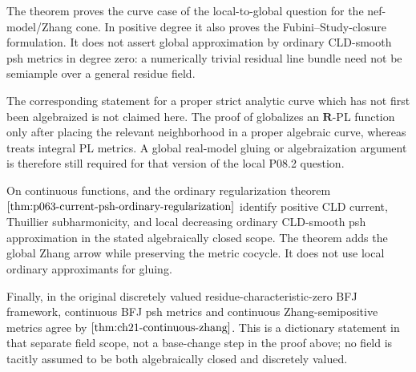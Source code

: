 \begin{remark}
\label{rem:p081-curve-comparisons}
The theorem proves the curve case of the local-to-global question for the
nef-model/Zhang cone. In positive degree it also proves the
Fubini--Study-closure formulation. It does not assert global approximation
by ordinary CLD-smooth psh metrics in degree zero: a numerically trivial
residual line bundle need not be semiample over a general residue field.

The corresponding statement for a proper strict analytic curve which has
not first been algebraized is not claimed here. The proof of
\cite[Thm.~5.6]{GR25PL} globalizes an \(\mathbf R\)-PL function only after
placing the relevant neighborhood in a proper algebraic curve, whereas
\cite[Prop.~2.10]{GM19} treats integral PL metrics. A global real-model
gluing or algebraization argument is therefore still required for that
version of the local P08.2 question.

On continuous functions, \cite[Thm.~4.7 and Cor.~4.8]{Wanner19} and the
ordinary regularization theorem
\(\cref{thm:p063-current-psh-ordinary-regularization}\) identify positive
CLD current, Thuillier subharmonicity, and local decreasing ordinary
CLD-smooth psh approximation in the stated algebraically closed scope.
The theorem adds the global Zhang arrow while preserving the metric
cocycle. It does not use local ordinary approximants for gluing.

Finally, in the original discretely valued residue-characteristic-zero BFJ
framework, continuous BFJ psh metrics and continuous Zhang-semipositive
metrics agree by \(\cref{thm:ch21-continuous-zhang}\). This is a dictionary
statement in that separate field scope, not a base-change step in the proof
above; no field is tacitly assumed to be both algebraically closed and
discretely valued.
\end{remark}
